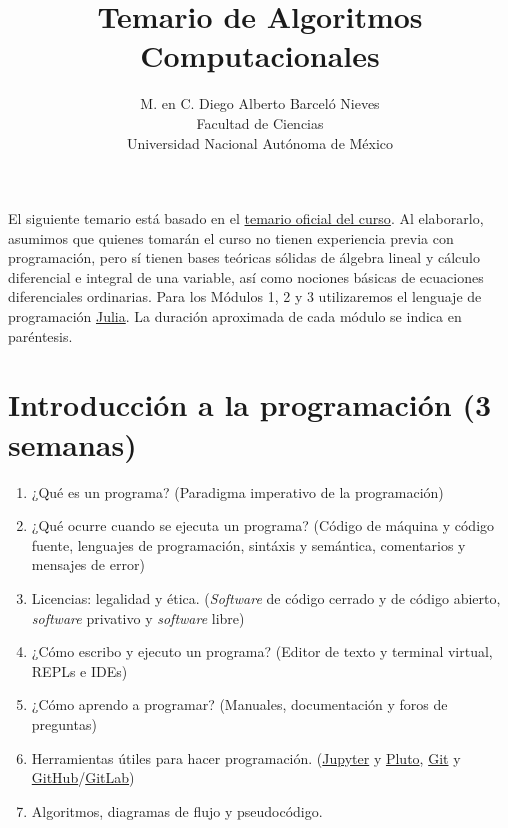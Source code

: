 \documentclass[a4paper]{article}
\begin{document}
\title{Temario de Algoritmos Computacionales}
\author{M. en C. Diego Alberto Barceló Nieves \\ Facultad de Ciencias \\ Universidad Nacional Autónoma de México}
\date{}
\maketitle

El siguiente temario está basado en el \href{https://www.fciencias.unam.mx/estudiar-en-ciencias/estudios/licenciaturas/asignaturas/2016/1430}{temario oficial del curso}. Al elaborarlo, asumimos que quienes tomarán el curso no tienen experiencia previa con programación, pero sí tienen bases teóricas sólidas de álgebra lineal y cálculo diferencial e integral de una variable, así como nociones básicas de ecuaciones diferenciales ordinarias. Para los Módulos 1, 2 y 3 utilizaremos el lenguaje de programación \href{https://julialang.org/}{Julia}. La duración aproximada de cada módulo se indica en paréntesis.

\setcounter{section}{-1}

\section{Introducción a la programación (3 semanas)} \label{Sec: Introducción a la programación (3 semanas)} 

\begin{enumerate}[label=\arabic*.]

    \item ¿Qué es un programa? (Paradigma imperativo de la programación)

    \item ¿Qué ocurre cuando se ejecuta un programa? (Código de máquina y código fuente, lenguajes de programación, sintáxis y semántica, comentarios y mensajes de error)
    \item Licencias: legalidad y ética. (\emph{Software} de código cerrado y de código abierto, \emph{software} privativo y \emph{software} libre)
    \item ¿Cómo escribo y ejecuto un programa? (Editor de texto y terminal virtual, REPLs e IDEs)
    \item ¿Cómo aprendo a programar? (Manuales, documentación y foros de preguntas)
    \item Herramientas útiles para hacer programación. (\href{https://jupyter.org/}{Jupyter} y \href{https://github.com/fonsp/Pluto.jl/blob/main/README.md}{Pluto}, \href{https://git-scm.com/}{Git} y \href{https://github.com/}{GitHub}/\href{https://about.gitlab.com/}{GitLab})
    \item Algoritmos, diagramas de flujo y pseudocódigo.
\end{enumerate}
\end{document}
